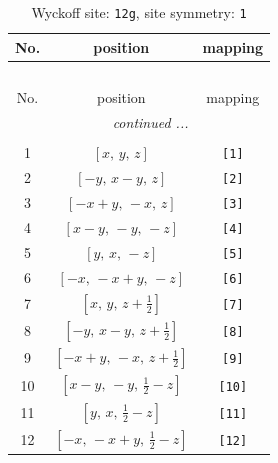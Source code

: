 \documentclass[fleqn,8pt]{jsarticle}
\begin{document}
\renewcommand{\arraystretch}{1.2}
\begin{longtable}{ccc}
\caption{Wyckoff site: {\tt 12g}, site symmetry: {\tt 1}}
 \\
 \hline \hline
No. & position & mapping \\ \hline \endfirsthead

\multicolumn{2}{l}{\tablename\ \thetable{}} \\
 \hline \hline
No. & position & mapping \\ \hline \endhead

 \hline \hline
\multicolumn{2}{r}{\footnotesize\it continued ...} \\ \endfoot

 \hline \hline
\multicolumn{2}{r}{} \\ \endlastfoot

1 & $\left[ x,\, y,\, z \right]$ & {\tt [1]} \\ \hline
2 & $\left[ - y,\, x - y,\, z \right]$ & {\tt [2]} \\ \hline
3 & $\left[ - x + y,\, - x,\, z \right]$ & {\tt [3]} \\ \hline
4 & $\left[ x - y,\, - y,\, - z \right]$ & {\tt [4]} \\ \hline
5 & $\left[ y,\, x,\, - z \right]$ & {\tt [5]} \\ \hline
6 & $\left[ - x,\, - x + y,\, - z \right]$ & {\tt [6]} \\ \hline
7 & $\left[ x,\, y,\, z + \frac{1}{2} \right]$ & {\tt [7]} \\ \hline
8 & $\left[ - y,\, x - y,\, z + \frac{1}{2} \right]$ & {\tt [8]} \\ \hline
9 & $\left[ - x + y,\, - x,\, z + \frac{1}{2} \right]$ & {\tt [9]} \\ \hline
10 & $\left[ x - y,\, - y,\, \frac{1}{2} - z \right]$ & {\tt [10]} \\ \hline
11 & $\left[ y,\, x,\, \frac{1}{2} - z \right]$ & {\tt [11]} \\ \hline
12 & $\left[ - x,\, - x + y,\, \frac{1}{2} - z \right]$ & {\tt [12]} \\
\end{longtable}
\end{document}
